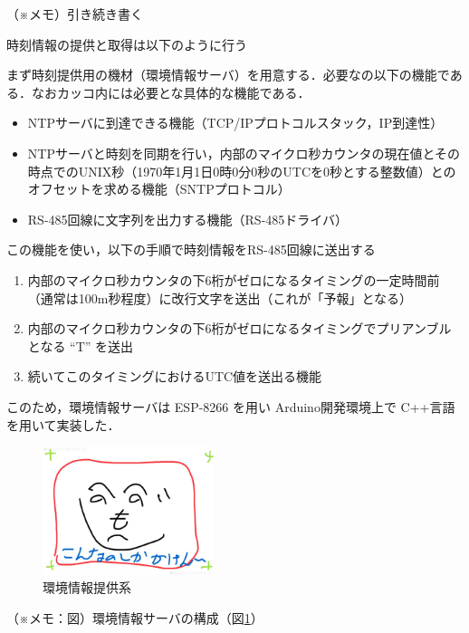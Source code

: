 （※メモ）引き続き書く


時刻情報の提供と取得は以下のように行う

まず時刻提供用の機材（環境情報サーバ）を用意する．必要なの以下の機能である．なおカッコ内には必要とな具体的な機能である．

\begin{itemize}
\item NTPサーバに到達できる機能（TCP/IPプロトコルスタック，IP到達性）
\item NTPサーバと時刻を同期を行い，内部のマイクロ秒カウンタの現在値とその時点でのUNIX秒（1970年1月1日0時0分0秒のUTCを0秒とする整数値）とのオフセットを求める機能（SNTPプロトコル）
\item RS-485回線に文字列を出力する機能（RS-485ドライバ）
\end{itemize}

この機能を使い，以下の手順で時刻情報をRS-485回線に送出する

\begin{enumerate}
\item 内部のマイクロ秒カウンタの下6桁がゼロになるタイミングの一定時間前（通常は100m秒程度）に改行文字を送出（これが「予報」となる）
\item 内部のマイクロ秒カウンタの下6桁がゼロになるタイミングでプリアンブルとなる ``T'' を送出
\item 続いてこのタイミングにおけるUTC値を送出る機能
\end{enumerate}

このため，環境情報サーバは ESP-8266 を用い Arduino開発環境上で C++言語を用いて実装した．

\begin{figure}[H]
\centering
\includegraphics[width=5cm]{figspics/henoheno.jpeg}
\caption{環境情報提供系}
\label{hohno:RaspberryComPoTE-T}
\end{figure}

（※メモ：図）環境情報サーバの構成（図\ref{hohno:RaspberryComPoTE-T}）


